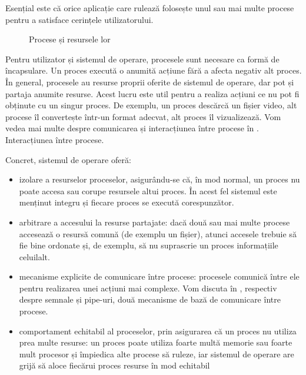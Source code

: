 \begin{note}
Esențial este că orice aplicație care rulează folosește unul sau mai multe procese pentru a satisface cerințele utilizatorului.
\end{note}

\begin{figure}[!htbp]
	\centering
	\def\svgwidth{0.8\textwidth}
	
	\caption{Procese și resursele lor}
	\label{fig:process-overview}
\end{figure}

Pentru utilizator și sistemul de operare, procesele sunt necesare ca formă de
încapsulare. Un proces execută o anumită acțiune fără a afecta negativ alt
proces. În general, procesele au resurse proprii oferite de sistemul de operare,
dar pot și partaja anumite resurse. Acest lucru este util pentru a realiza
acțiuni ce nu pot fi obținute cu un singur proces. De exemplu, un proces
descărcă un fișier video, alt procese îl convertește într-un format adecvat, alt
proces îl vizualizează. Vom vedea mai multe despre comunicarea și interacțiunea
între procese în . Interacțiunea
între procese.

Concret, sistemul de operare oferă:

\begin{itemize}
	\item izolare a resurselor proceselor, asigurându-se că, în mod normal,
		un proces nu poate accesa sau corupe resursele altui proces. În
		acest fel sistemul este menținut integru și fiecare proces se
		execută corespunzător.
	\item arbitrare a accesului la resurse partajate: dacă două sau mai
		multe procese accesează o resursă comună (de exemplu un fișier),
		atunci accesele trebuie să fie bine ordonate și, de exemplu, să
		nu suprascrie un proces informațiile celuilalt.
	\item mecanisme explicite de comunicare între procese: procesele
		comunică între ele pentru realizarea unei acțiuni mai complexe.
                Vom discuta în , respectiv  despre semnale și pipe-uri,
		două mecanisme de bază de comunicare între procese.
	\item comportament echitabil al proceselor, prin asigurarea că un proces
		nu utiliza prea multe resurse: un proces poate utiliza foarte
		multă memorie sau foarte mult procesor și împiedica alte procese
		să ruleze, iar sistemul de operare are grijă să aloce fiecărui
		proces resurse în mod echitabil
\end{itemize}

